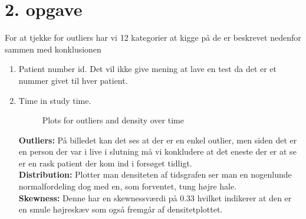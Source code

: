 \chapter{2. opgave}
For at tjekke for outliers har vi 12 kategorier at kigge på de er beskrevet nedenfor sammen med konklusionen
\begin{enumerate}
\item Patient number id. \newline
Det vil ikke give mening at lave en test da det er et nummer givet til hver patient.
\item  Time in study time.
\newline

\begin{figure}[h]
  \centering
  \hfill
  \hfill
  \caption{Plots for outliers and density over time}
\end{figure}

\textbf{Outliers: }På billedet kan det ses at der er en enkel outlier, men siden det er en person der var i live i slutning må vi konkludere at det eneste der er at se er en rask patient der kom ind i forsøget tidligt.\\
\textbf{Distribution:} Plotter man densiteten af tidsgrafen ser man en nogenlunde normalfordeling dog med en, som forventet, tung højre hale.\\
\textbf{Skewness:} Denne har en skewnessværdi på 0.33 hvilket indikerer at den er en smule højreskæv som også fremgår af densitetplottet.



\end{enumerate}
